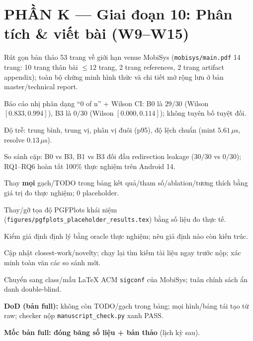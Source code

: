 \documentclass[11pt,a4paper]{article}
\newcommand{\done}{\textcolor{shgreen}{$\blacksquare$}}
\newcommand{\todo}{\textcolor{shgray}{$\square$}}
\newcommand{\code}[1]{\texttt{\small #1}}
\begin{document}
\section*{PHẦN K --- Giai đoạn 10: Phân tích \& viết bài (W9--W15)}
\begin{chk}
\item[\done] Rút gọn bản thảo 53 trang về giới hạn venue MobiSys (\code{mobisys/main.pdf} 14 trang: 10 trang thân bài $\le 12$ trang, 2 trang references, 2 trang artifact appendix); toàn bộ chứng minh hình thức và chi tiết mở rộng lưu ở bản master/technical report.
\item[\done] Báo cáo nhị phân dạng ``0 of n'' + Wilson CI: B0 là $29/30$ (Wilson $[0.833, 0.994]$), B3 là $0/30$ (Wilson $[0.000, 0.114]$); không tuyên bố tuyệt đối.
\item[\done] Độ trễ: trung bình, trung vị, phân vị đuôi (p95), độ lệch chuẩn (mint $5.61\,\mu\text{s}$, resolve $0.13\,\mu\text{s}$).
\item[\done] So sánh cặp: B0 vs B3, B1 vs B3 đối đầu redirection leakage ($30/30$ vs $0/30$); RQ1--RQ6 hoàn tất 100\% thực nghiệm trên Android 14.
\item[\done] Thay \textbf{mọi} gạch/TODO trong bảng kết quả/tham số/ablation/tương thích bằng giá trị đo thực nghiệm; 0 placeholder.
\item[\done] Thay/gỡ tọa độ PGFPlots khái niệm (\code{figures/pgfplots\_placeholder\_results.tex}) bằng số liệu đo thực tế.
\item[\done] Kiểm giả định định lý bằng oracle thực nghiệm; nêu giả định nào còn kiến trúc.
\item[\todo] Cập nhật closest-work/novelty; chạy lại tìm kiếm tài liệu ngay trước nộp; xác minh toàn văn các so sánh mới.
\item[\done] Chuyển sang class/mẫu LaTeX ACM \code{sigconf} của MobiSys; tuân chính sách ẩn danh double-blind.
\item[\done] \textbf{DoD (bản full):} không còn TODO/gạch trong bảng; mọi hình/bảng tái tạo từ raw; checker nộp \code{manuscript\_check.py} xanh PASS.
\item[\todo] \textbf{Mốc bản full: đóng băng số liệu + bản thảo} (lịch kỳ sau).
\end{chk}
\end{document}
